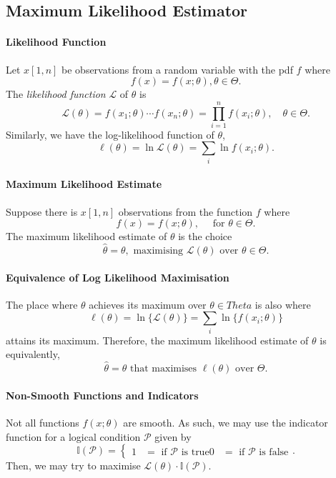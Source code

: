 \subsection{Maximum Likelihood Estimator}

\paragraph{Likelihood Function}
Let \(x[1, n]\) be observations from a random variable with the pdf \(f\)
where  \[
  f(x) = f(x; \theta), \theta \in \Theta
.\] The \textit{likelihood function} \(\mathcal{L}\) of \(\theta\) is \[
  \mathcal{L}(\theta) = f(x_1; \theta) \cdots f(x_n; \theta)
  = \prod_{i = 1}^n f(x_i; \theta), \quad \theta \in \Theta
.\] 
Similarly, we have the log-likelihood function of \(\theta\), \[
  \ell(\theta) = \ln{\mathcal{L}(\theta)} = \sum_i \ln{f(x_i; \theta)}
.\] 

\paragraph{Maximum Likelihood Estimate}
Suppose there is \(x[1, n]\) observations from the function \(f\) where \[
  f(x) = f(x; \theta), \quad \text{ for } \theta \in  \Theta
.\]
The maximum likelihood estimate of \(\theta\) is the choice \[
  \hat{\theta} = \theta, \text{ maximising } \mathcal{L}(\theta) \text{ over } \theta \in \Theta
.\] 

\paragraph{Equivalence of Log Likelihood Maximisation}
The place where \(\mathcal{\theta}\) achieves its maximum over \(\theta \in Theta\)
is also where \[
  \ell(\theta) = \ln \{\mathcal{L}(\theta)\} = \sum_{i} \ln \{f(x_i; \theta)\} 
\]  attains its maximum. Therefore, the maximum likelihood estimate of \(\theta\)
is equivalently, \[
  \hat{\theta} = \theta \text{ that maximises } \ell(\theta) \text{ over } \Theta
.\] 

\paragraph{Non-Smooth Functions and Indicators}
Not all functions \(f(x; \theta)\) are smooth. As such, we may use the
indicator function for a logical condition \(\mathcal{P}\) given by \[
  \mathbb{I}(\mathcal{P}) = \begin{cases}
    1 &= \text{ if } \mathcal{P} \text{ is true}
    0 &= \text{ if } \mathcal{P} \text{ is false}
  \end{cases}
.\] 
Then, we may try to maximise \(\mathcal{L}(\theta)\cdot \mathbb{I}(\mathcal{P})\).


